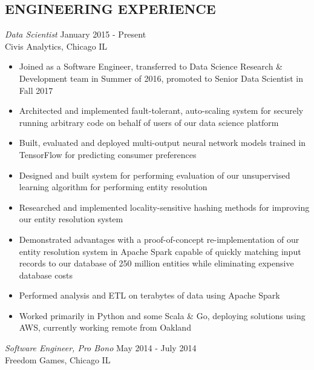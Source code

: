 \documentclass[line,margin]{res}
\begin{document}
\address{waltaskew@gmail.com}
\address{404-819-9796}

\begin{resume}

\section{ENGINEERING EXPERIENCE}
        {\sl Data Scientist} \hfill January 2015 - Present \\
        Civis Analytics, Chicago IL
        \begin{itemize}
          \item Joined as a Software Engineer, transferred to Data
            Science Research \& Development team in Summer of 2016,
            promoted to Senior Data Scientist in Fall 2017
          \item Architected and implemented fault-tolerant,
            auto-scaling system for securely running arbitrary code on
            behalf of users of our data science platform
          \item Built, evaluated and deployed multi-output neural
            network models trained in TensorFlow for predicting
            consumer preferences
          \item Designed and built system for performing evaluation of
            our unsupervised learning algorithm for performing entity
            resolution
          \item Researched and implemented locality-sensitive hashing
            methods for improving our entity resolution system
          \item Demonstrated advantages with a proof-of-concept
            re-implementation of our entity resolution system in
            Apache Spark capable of quickly matching input records to
            our database of 250 million entities while eliminating
            expensive database costs
          \item Performed analysis and ETL on terabytes of data using
            Apache Spark
          \item Worked primarily in Python and some Scala \& Go, deploying
            solutions using AWS, currently working remote from Oakland
        \end{itemize}
        {\sl Software Engineer, Pro Bono} \hfill May 2014 - July 2014 \\
        Freedom Games, Chicago IL
        \begin{itemize}

\end{itemize}
\end{resume}
\end{document}
